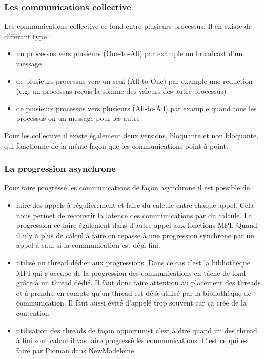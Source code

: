 \subsubsection{Les communications collective}

Les communications collective ce fond entre plusieurs processus.
Il en existe de différant type :
\begin{itemize}
  \item un processus vers plusieurs (One-to-All) par example un broadcast d'un message
  \item de plusieurs processus vers un seul (All-to-One) par example une reduction (e.g. un processus reçois la somme des valeurs des autre processus)
  \item de plusieurs processus vers plusieurs (All-to-All) par example quand tous les processus on un message pour les autre
\end{itemize}
Pour les collective il existe également deux versions, bloquante et non bloquante, qui fonctionne de la même façon que les communications point à point.

\subsubsection{La progression asynchrone}

Pour faire progressé les communications de façon asynchrone il est possible de :

\begin{itemize}
  \item faire des appels à  régulièrement et faire du calcule entre chaque appel.
  Cela nous permet de recouvrir la latence des communications par du calcule.
  La progression ce faire également dans d'autre appel aux fonctions MPI.
  Quand il n'y à plus de calcul à faire on repasse à une progression synchrone par un appel à  sauf si la communication est déjà fini.
  \item utilisé un thread dédier aux progressions.
  Dans ce cas c'est la bibliothèque MPI qui s'occupe de la progression des communications en tâche de fond grâce à un thread dédié.
  Il faut donc faire attention au placement des threads et à prendre en compte qu'un thread est déjà utilisé par la bibliothèque de communication.
  Il faut aussi évité d'appelé trop souvent  car ça crée de la contention
  \item utilisation des threads de façon opportunist c'est à dire quand un des thread à fini sont calcul il vas faire progressé les communications.
  C'est ce qui est faire par Pioman dans NewMadeleine.
\end{itemize}


